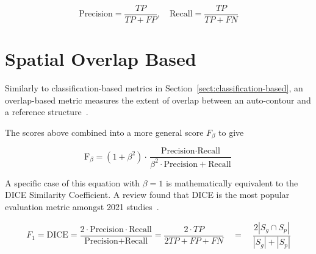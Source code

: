 \documentclass[11pt,twoside]{report}
\begin{document}
\begin{equation*}
 \text{Precision} = \frac{TP}{TP+FP}, \quad \text{Recall} = \frac{TP}{TP+FN}
\end{equation*}

\section{Spatial Overlap Based}\label{sect:spatial-overlap-based}

Similarly to classification-based metrics in Section~\ref{sect:classification-based}, an overlap-based metric measures the extent of overlap between an auto-contour and a reference structure~\cite{review-metrics}.

The scores above combined into a more general score $F_\beta$ to give

\begin{equation*}
 \text{F}_\beta = (1+\beta^2)\cdot \frac{\text{Precision} \cdot \text{Recall}}{\beta^2 \cdot \text{Precision}+\text{Recall}}
\end{equation*}

A specific case of this equation with $\beta=1$ is mathematically equivalent to the DICE Similarity Coefficient. A review found that DICE is the most popular evaluation metric amongst 2021 studies~\cite{review-metrics,evaluation-metrics, Sherer2021-le}.


\begin{equation*}
 F_1 = \text{DICE} = \frac{2 \cdot \text{Precision} \cdot \text{Recall}} {\text{Precision} + \text{Recall}} = \frac{2 \cdot TP}{2TP + FP + FN} \quad = \quad \frac{2|S_g\cap S_p|}{|S_g|+|S_p|}
\end{equation*}
\end{document}
